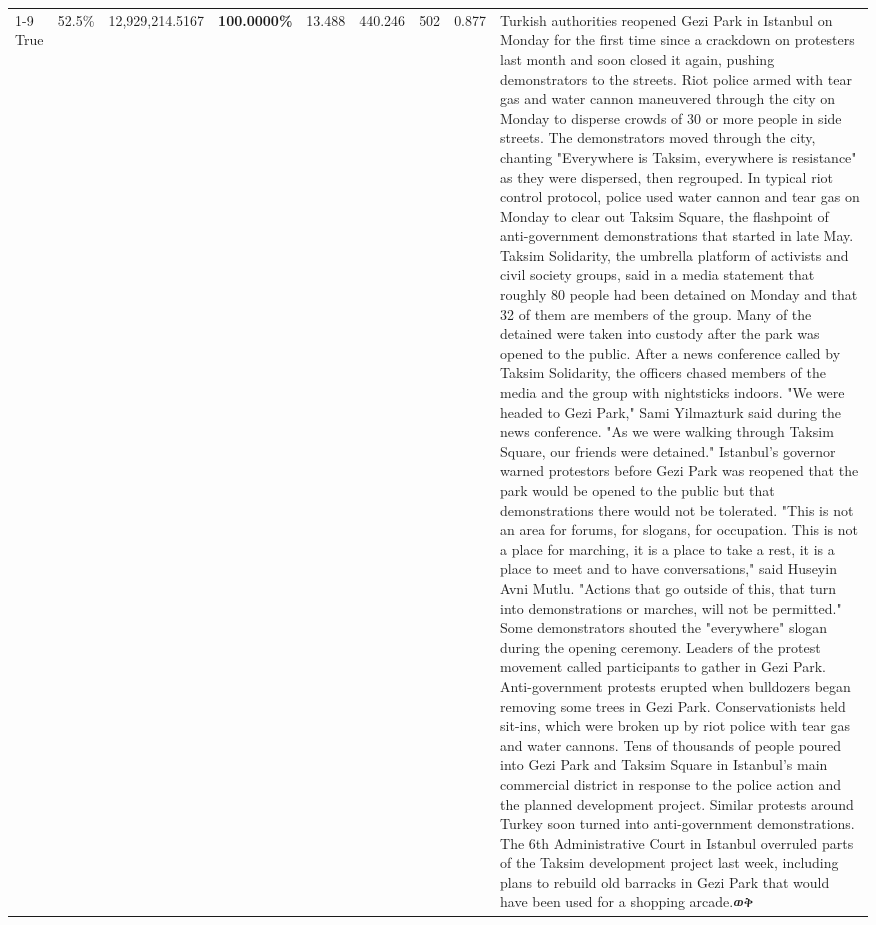 \begin{table}[H]
\begin{tabular}{lllrlllll}
\cline{1-9}
True & 52.5\% & 12,929,214.5167 & \bfseries \color{red} 100.0000\% & 13.488 & 440.246 & 502 & 0.877 & Turkish authorities reopened Gezi Park in Istanbul on Monday for the first time since a crackdown on protesters last month and soon closed it again, pushing demonstrators to the streets. Riot police armed with tear gas and water cannon maneuvered through the city on Monday to disperse crowds of 30 or more people in side streets. The demonstrators moved through the city, chanting "Everywhere is Taksim, everywhere is resistance" as they were dispersed, then regrouped. In typical riot control protocol, police used water cannon and tear gas on Monday to clear out Taksim Square, the flashpoint of anti-government demonstrations that started in late May. Taksim Solidarity, the umbrella platform of activists and civil society groups, said in a media statement that roughly 80 people had been detained on Monday and that 32 of them are members of the group. Many of the detained were taken into custody after the park was opened to the public. After a news conference called by Taksim Solidarity, the officers chased members of the media and the group with nightsticks indoors. "We were headed to Gezi Park," Sami Yilmazturk said during the news conference. "As we were walking through Taksim Square, our friends were detained." Istanbul's governor warned protestors before Gezi Park was reopened that the park would be opened to the public but that demonstrations there would not be tolerated. "This is not an area for forums, for slogans, for occupation. This is not a place for marching, it is a place to take a rest, it is a place to meet and to have conversations," said Huseyin Avni Mutlu. "Actions that go outside of this, that turn into demonstrations or marches, will not be permitted." Some demonstrators shouted the "everywhere" slogan during the opening ceremony. Leaders of the protest movement called participants to gather in Gezi Park. Anti-government protests erupted when bulldozers began removing some trees in Gezi Park. Conservationists held sit-ins, which were broken up by riot police with tear gas and water cannons. Tens of thousands of people poured into Gezi Park and Taksim Square in Istanbul's main commercial district in response to the police action and the planned development project. Similar protests around Turkey soon turned into anti-government demonstrations. The 6th Administrative Court in Istanbul overruled parts of the Taksim development project last week, including plans to rebuild old barracks in Gezi Park that would have been used for a shopping arcade.ወቅ \\

\end{tabular}
\end{table}
